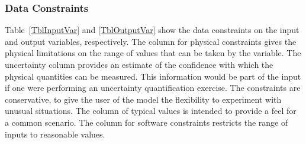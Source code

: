 \documentclass[12pt]{article}
\newcommand{\ddref}[1]{DD\ref{#1}}
\newcommand{\aref}[1]{A\ref{#1}}
\newcommand{\iref}[1]{IM\ref{#1}}
\begin{document}

\subsubsection{Data Constraints} \label{sec_DataConstraints}    

Table~\ref{TblInputVar} and \ref{TblOutputVar} show the data constraints on the input and output variables, respectively. The column for physical constraints gives the physical limitations on the range of values that can be taken by the variable. The uncertainty column provides an estimate of the confidence with which the physical quantities can be measured. This information would be part of the input if one were performing an uncertainty quantification exercise. The constraints are conservative, to give the user of the model the flexibility to experiment with unusual situations. The column of typical values is intended to provide a feel for a common scenario. The column for software constraints restricts the range of inputs to reasonable values. 
\end{document}
